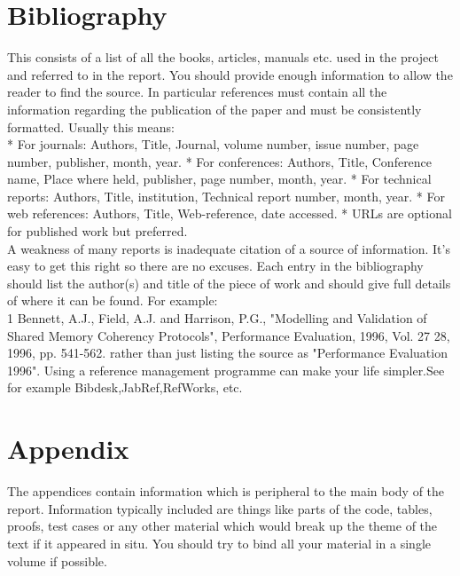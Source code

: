 \documentclass[12pt,twoside]{article}
\begin{document}
\newpage

\section{Bibliography}
This consists of a list of all the books, articles, manuals etc. used in the project and referred to in the report. You should provide enough information to allow the reader to find the source. In particular references must contain all the information regarding the publication of the paper and must be consistently formatted. Usually this means:\\
* For journals: Authors, Title, Journal, volume number, issue number, page number, publisher, month, year.
* For conferences: Authors, Title, Conference name, Place where held, publisher, page number, month, year.
* For technical reports: Authors, Title, institution, Technical report number, month, year.
* For web references: Authors, Title, Web-reference, date accessed.
* URLs are optional for published work but preferred.\\
A weakness of many reports is inadequate citation of a source of information. It's easy to get this right so there are no excuses. Each entry in the bibliography should list the author(s) and title of the piece of work and should give full details of where it can be found. For example:\\
1 Bennett, A.J., Field, A.J. and Harrison, P.G., "Modelling and Validation of Shared Memory Coherency Protocols", Performance Evaluation, 1996, Vol. 27  28, 1996, pp. 541-562. rather than just listing the source as "Performance Evaluation 1996".
Using a reference management programme can make your life simpler.See for example Bibdesk,JabRef,RefWorks, etc.\\


\newpage

\section{Appendix}
The appendices contain information which is peripheral to the main body of the report. Information typically included are things like parts of the code, tables, proofs, test cases or any other material which would break up the theme of the text if it appeared in situ. You should try to bind all your material in a single volume if possible.\\

\newpage
\end{document}
